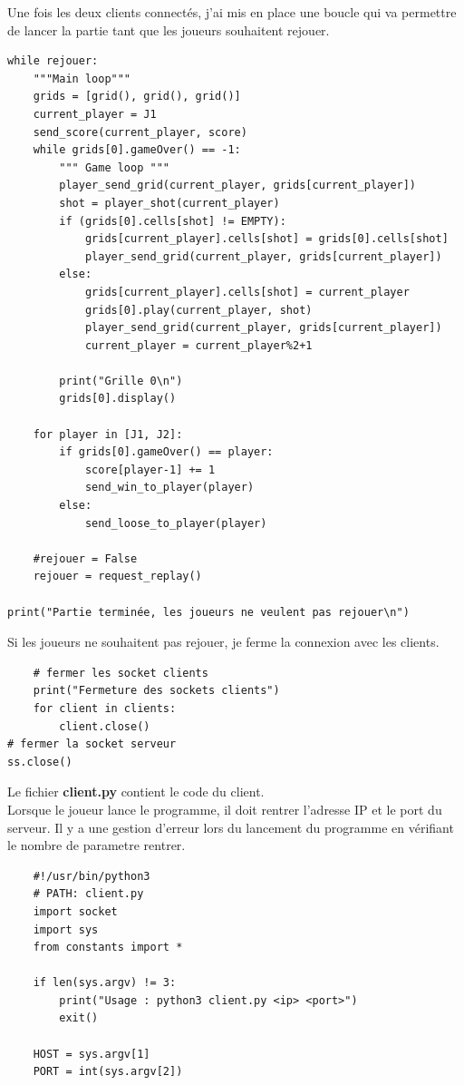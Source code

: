 \documentclass{article}
\begin{document}
Une fois les deux clients connectés, j'ai mis en place une boucle qui va permettre de lancer la partie tant que les joueurs souhaitent rejouer.\\
\begin{lstlisting}
while rejouer:
    """Main loop"""
    grids = [grid(), grid(), grid()]
    current_player = J1
    send_score(current_player, score)
    while grids[0].gameOver() == -1:
        """ Game loop """
        player_send_grid(current_player, grids[current_player])
        shot = player_shot(current_player)
        if (grids[0].cells[shot] != EMPTY):
            grids[current_player].cells[shot] = grids[0].cells[shot]
            player_send_grid(current_player, grids[current_player])
        else:
            grids[current_player].cells[shot] = current_player
            grids[0].play(current_player, shot)
            player_send_grid(current_player, grids[current_player])
            current_player = current_player%2+1
        
        print("Grille 0\n")
        grids[0].display()

    for player in [J1, J2]:
        if grids[0].gameOver() == player:
            score[player-1] += 1
            send_win_to_player(player)
        else:
            send_loose_to_player(player)

    #rejouer = False
    rejouer = request_replay()
            
print("Partie terminée, les joueurs ne veulent pas rejouer\n")
\end{lstlisting}
Si les joueurs ne souhaitent pas rejouer, je ferme la connexion avec les clients.\\
\begin{lstlisting}
    # fermer les socket clients
    print("Fermeture des sockets clients")
    for client in clients:
        client.close()
# fermer la socket serveur
ss.close()
\end{lstlisting}
Le fichier \textbf{client.py} contient le code du client.\\
Lorsque le joueur lance le programme, il doit rentrer l'adresse IP et le port du serveur. Il y a une gestion d'erreur lors du lancement du programme en vérifiant le nombre de parametre rentrer.\\
\begin{lstlisting}
    #!/usr/bin/python3
    # PATH: client.py
    import socket
    import sys
    from constants import *

    if len(sys.argv) != 3:
        print("Usage : python3 client.py <ip> <port>")
        exit()

    HOST = sys.argv[1]
    PORT = int(sys.argv[2])
\end{lstlisting}
\end{document}
